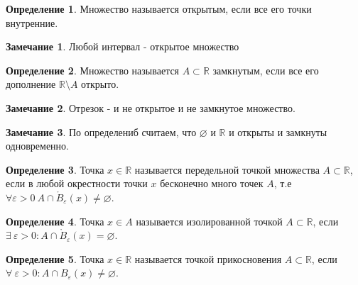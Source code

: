 \documentclass[a4paper, 12pt]{article}
\newcommand{\R}{\mathbb{R}}
\renewcommand{\epsilon}{\varepsilon}
\renewcommand{\emptyset}{\varnothing}
\theoremstyle{definition}
\newtheorem*{definition}{Определение}
\newtheorem*{comm}{Замечание}
\begin{document}
        \begin{definition}
            Множество называется открытым, если все его точки внутренние.
        \end{definition}
        \begin{comm}
            Любой интервал - открытое множество
        \end{comm}
        \begin{definition}
            Множество называется $A\subset \R$ замкнутым, если все его дополнение $\R\setminus A$ открыто.
        \end{definition} 
        \begin{comm}
            Отрезок - и не открытое и не замкнутое множество.
        \end{comm}
        \begin{comm}
            По определениб считаем, что $\emptyset$ и $\R$ и открыты и замкнуты одновременно.
        \end{comm} 
        \begin{definition}
            Точка $x\in \R$ называется передельной точкой множества $A\subset \R$, если в любой окрестности точки $x$ бесконечно много точек $A$, т.е\\
            $\forall \epsilon >0\ A\cap \mathring{B}_{\epsilon}(x)\ne\emptyset$.
        \end{definition} 
        \begin{definition}
            Точка $x\in A$ называется изолированной точкой $A\subset \R$, если $\exists \ \epsilon>0: A\cap \mathring{B}_{\epsilon}(x)=\emptyset$.
        \end{definition} 
        \begin{definition}
            Точка $x\in \R$ называется точкой прикосновения $A\subset \R$, если $\forall \ \epsilon>0: A\cap {B}_{\epsilon}(x)\ne\emptyset$.
        \end{definition} 
\end{document}
